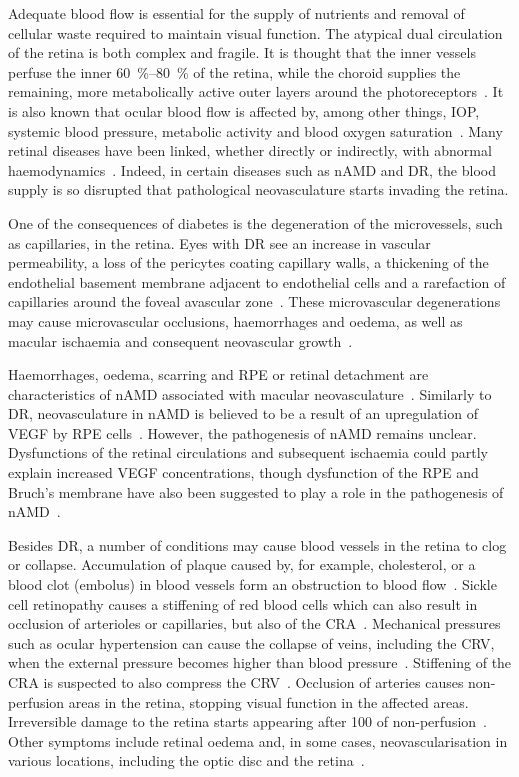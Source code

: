 \documentclass{article}
\begin{document}
Adequate blood flow is essential for the supply of nutrients and removal of cellular waste required to maintain visual function.
The atypical dual circulation of the retina is both complex and fragile.
It is thought that the inner vessels perfuse the inner \SIrange{60}{80}{\percent} of the retina, while the choroid supplies the remaining, more metabolically active outer layers around the photoreceptors~\cite{Birol_2007}.
It is also known that ocular blood flow is affected by, among other things, IOP, systemic blood pressure, metabolic activity and blood oxygen saturation~\cite{Birol_2007,McCullough_1997,Palkovits_2014,Polska_2007,Pournaras_2008,Riva_1997,Wang_2014}.
Many retinal diseases have been linked, whether directly or indirectly, with abnormal haemodynamics~\cite{Hayreh_2004,Medina_2016}.
Indeed, in certain diseases such as nAMD and DR, the blood supply is so disrupted that pathological neovasculature starts invading the retina.

One of the consequences of diabetes is the degeneration of the microvessels, such as capillaries, in the retina.
Eyes with DR see an increase in vascular permeability, a loss of the pericytes coating capillary walls, a thickening of the endothelial basement membrane adjacent to endothelial cells and a rarefaction of capillaries around the foveal avascular zone~\cite{Medina_2016}.
These microvascular degenerations may cause microvascular occlusions, haemorrhages and oedema, as well as macular ischaemia and consequent neovascular growth~\cite{Medina_2016}.

Haemorrhages, oedema, scarring and RPE or retinal detachment are characteristics of nAMD associated with macular neovasculature~\cite{Gupta_2015,Jager_2008}.
Similarly to DR, neovasculature in nAMD is believed to be a result of an upregulation of VEGF by RPE cells~\cite{Jager_2008}.
However, the pathogenesis of nAMD remains unclear.
Dysfunctions of the retinal circulations and subsequent ischaemia could partly explain increased VEGF concentrations, though dysfunction of the RPE and Bruch's membrane have also been suggested to play a role in the pathogenesis of nAMD~\cite{Ambati_and_Fowler_2012,Pemp_2008,Liu_1995}.

Besides DR, a number of conditions may cause blood vessels in the retina to clog or collapse.
Accumulation of plaque caused by, for example, cholesterol, or a blood clot (embolus) in blood vessels form an obstruction to blood flow~\cite{Medina_2016}.
Sickle cell retinopathy causes a stiffening of red blood cells which can also result in occlusion of arterioles or capillaries, but also of the CRA~\cite{Medina_2016}.
Mechanical pressures such as ocular hypertension can cause the collapse of veins, including the CRV, when the external pressure becomes higher than blood pressure~\cite{Hayreh_2004}.
Stiffening of the CRA is suspected to also compress the CRV~\cite{Medina_2016}.
Occlusion of arteries causes non-perfusion areas in the retina, stopping visual function in the affected areas.
Irreversible damage to the retina starts appearing after \SI{100}{\min} of non-perfusion~\cite{Hayreh_2004}.
Other symptoms include retinal oedema and, in some cases, neovascularisation in various locations, including the optic disc and the retina~\cite{Medina_2016}.
\end{document}
